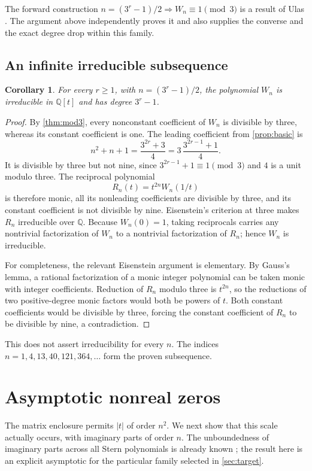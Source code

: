 \documentclass[11pt]{article}
\numberwithin{equation}{section}
\newtheorem{corollary}[theorem]{Corollary}
\theoremstyle{definition}
\newcommand{\Q}{\mathbb Q}
\begin{document}
The forward construction $n=(3^r-1)/2\Rightarrow W_n\equiv1\pmod3$
is a result of Ulas \cite[Theorem 3.1]{Ulas}.
The argument above independently proves it and also supplies the converse
and the exact degree drop within this family.

\subsection{An infinite irreducible subsequence}

\begin{corollary}\label{cor:irreducible}
For every $r\geq1$, with $n=(3^r-1)/2$, the polynomial $W_n$ is
irreducible in $\Q[t]$ and has degree $3^r-1$.
\end{corollary}
\begin{proof}
By \cref{thm:mod3}, every nonconstant coefficient of $W_n$ is divisible
by three, whereas its constant coefficient is one.
The leading coefficient from \cref{prop:basic} is
\[
 n^2+n+1=\frac{3^{2r}+3}{4}
         =3\,\frac{3^{2r-1}+1}{4}.
\]
It is divisible by three but not nine, since $3^{2r-1}+1\equiv1\pmod3$
and $4$ is a unit modulo three.
The reciprocal polynomial
\[
 R_n(t)=t^{2n}W_n(1/t)
\]
is therefore monic, all its nonleading coefficients are divisible by three,
and its constant coefficient is not divisible by nine.
Eisenstein's criterion at three makes $R_n$ irreducible over $\Q$.
Because $W_n(0)=1$, taking reciprocals carries any nontrivial factorization
of $W_n$ to a nontrivial factorization of $R_n$; hence $W_n$ is irreducible.

For completeness, the relevant Eisenstein argument is elementary.
By Gauss's lemma, a rational factorization of a monic integer polynomial
can be taken monic with integer coefficients.  Reduction of $R_n$ modulo
three is $t^{2n}$, so the reductions of two positive-degree monic factors
would both be powers of $t$.  Both constant coefficients would be divisible
by three, forcing the constant coefficient of $R_n$ to be divisible by nine,
a contradiction.
\end{proof}

This does not assert irreducibility for every $n$.  The indices
$n=1,4,13,40,121,364,\ldots$ form the proven subsequence.

\section{Asymptotic nonreal zeros}\label{sec:asymptotic}

The matrix enclosure permits $|t|$ of order $n^2$.  We next show that this
scale actually occurs, with imaginary parts of order $n$.
The unboundedness of imaginary parts across all Stern polynomials is
already known \cite[Theorem 10]{Altizio}; the result here is an explicit
asymptotic for the particular family selected in \cref{sec:target}.
\end{document}
